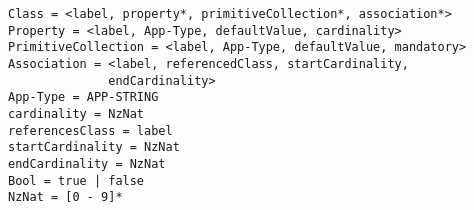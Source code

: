 \documentclass[11pt]{article}
\begin{document}
\begin{verbatim}
Class = <label, property*, primitiveCollection*, association*>
Property = <label, App-Type, defaultValue, cardinality>
PrimitiveCollection = <label, App-Type, defaultValue, mandatory>
Association = <label, referencedClass, startCardinality, 
              endCardinality>
App-Type = APP-STRING 
cardinality = NzNat
referencesClass = label
startCardinality = NzNat
endCardinality = NzNat
Bool = true | false
NzNat = [0 - 9]*
\end{verbatim}
\end{document}
